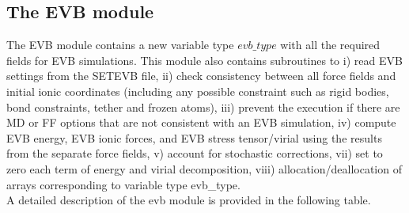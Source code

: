 \subsection{The EVB module}
The EVB module contains a new variable type $evb\_type$ with all the required fields for EVB simulations. This module also contains subroutines to i) read EVB settings from the SETEVB file, ii) check consistency between all force fields and initial ionic coordinates (including any possible constraint such as rigid bodies, bond constraints, tether and frozen atoms), iii) prevent the execution if there are MD or FF options that are not consistent with an EVB simulation, iv) compute EVB energy, EVB ionic forces, and EVB stress tensor/virial using the results from the separate force fields, v) account for stochastic corrections, vii) set to zero each term of energy and virial decomposition, viii) allocation/deallocation of arrays corresponding to variable type evb\_type.\\
A detailed description of the evb module is provided in the following table.
